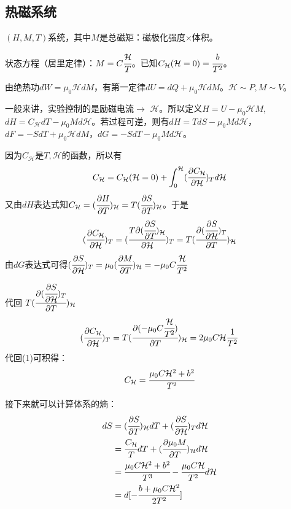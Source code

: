 \documentclass[a4paper,12pt]{article}
\newcommand{\Hc}{\mathcal{H}}
\newcommand{\myp}[3]{(\cfrac{\partial{#1}}{\partial{#2}})_{#3}}
\begin{document}
\subsection{热磁系统}
$(H, M, T)$系统，其中$M$是总磁矩：磁极化强度$\times$体积。\par
状态方程（居里定律）：$M = C\cfrac{\Hc}{T}$。已知$C_{\Hc}(\Hc = 0) = \cfrac{b}{T^2}$。\par
由绝热功$dW = \mu_0 \Hc dM$，有第一定律$dU = dQ + \mu_0 \Hc dM$。$\Hc \sim P, M \sim V$。\par
一般来讲，实验控制的是励磁电流$\rightarrow$ $\Hc$。所以定义$H = U - \mu_0 \Hc M$, $dH = C_{\Hc}dT - \mu_0 M d\Hc$。若过程可逆，则有$dH = TdS - \mu_0 M d\Hc$，$dF = -SdT + \mu_0 \Hc dM$，$dG = -SdT - \mu_0 M d\Hc$。\par
因为$C_{\Hc}$是$T, \Hc$的函数，所以有
\begin{equation}
C_{\Hc} = C_{\Hc}(\Hc = 0) + \int_0^{\Hc} \myp{C_{\Hc}}{\Hc}{T} d\Hc 
\end{equation}
又由$dH$表达式知$C_{\Hc} = \myp{H}{T}{\Hc} = T\myp{S}{T}{\Hc}$。于是
\begin{equation}
\myp{C_{\Hc}}{\Hc}{T} = (\cfrac{T\partial{\myp{S}{T}{\Hc}}}{\partial{\Hc}})_{T} = T\myp{\myp{S}{\Hc}{T}}{T}{\Hc} 
\end{equation}
由$dG$表达式可得$\myp{S}{\Hc}{T} = \mu_0 \myp{M}{T}{\Hc} =  - \mu_0 C \cfrac{\Hc}{T^2}$\par
代回 $T\myp{\myp{S}{\Hc}{T}}{T}{\Hc}$
\begin{equation}
\myp{C_{\Hc}}{\Hc}{T} = T\myp{( - \mu_0 C \cfrac{\Hc}{T^2})}{T}{\Hc} = 2\mu_0 C \Hc \frac{1}{T^2} 
\end{equation}
代回(1)可积得：
\begin{equation}
C_{\Hc} = \cfrac{\mu_0 C \Hc^2 + b^2}{T^2}
\end{equation}

\indent 接下来就可以计算体系的熵：
\begin{subequations}
\begin{align*}
dS &= \myp{S}{T}{\Hc}dT + \myp{S}{\Hc}{T} d\Hc \\
   &= \cfrac{C_{\Hc}}{T}dT + \myp{\mu_0 M}{T}{\Hc} d\Hc \\
   &= \cfrac{\mu_0 C \Hc^2 + b^2}{T^3} - \cfrac{\mu_0 C \Hc}{T^2}d\Hc \\
   &= d[- \cfrac{b + \mu_0 C \Hc^2}{2 T^2}] \\
\end{align*}
\end{subequations}
\end{document}
